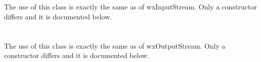 \section{}\label{wxfilterinputstream}




The use of this class is exactly the same as of wxInputStream. Only a constructor
differs and it is documented below.



\section{}\label{wxfilteroutputstream}




The use of this class is exactly the same as of wxOutputStream. Only a constructor
differs and it is documented below.

